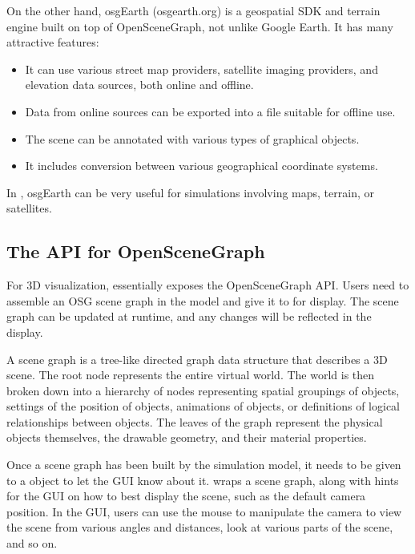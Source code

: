 On the other hand, osgEarth (osgearth.org) is a geospatial SDK and terrain
engine built on top of OpenSceneGraph, not unlike Google Earth. It has many
attractive features:

\begin{itemize}
  \item It can use various street map providers, satellite imaging providers, and
    elevation data sources, both online and offline.
  \item Data from online sources can be exported into a file suitable for offline use.
  \item The scene can be annotated with various types of graphical objects.
  \item It includes conversion between various geographical coordinate systems.
\end{itemize}

In \opp, osgEarth can be very useful for simulations involving maps, terrain, or satellites.

\subsection{The {\opp} API for OpenSceneGraph}
\label{sec:graphics:opp-api-for-osg}

For 3D visualization, {\opp} essentially exposes the OpenSceneGraph API. Users
need to assemble an OSG scene graph in the model and give it to {\opp} for
display. The scene graph can be updated at runtime, and any changes will be
reflected in the display.

\begin{note}
 A scene graph is a tree-like directed graph data
structure that describes a 3D scene. The root node represents the entire virtual
world. The world is then broken down into a hierarchy of nodes representing
spatial groupings of objects, settings of the position of objects, animations of
objects, or definitions of logical relationships between objects. The leaves of
the graph represent the physical objects themselves, the drawable geometry, and
their material properties.
\end{note}

Once a scene graph has been built by the simulation model, it needs to be given
to a  object to let the {\opp} GUI know about it.
 wraps a scene graph, along with hints for the GUI on how to
best display the scene, such as the default camera position. In the GUI, users
can use the mouse to manipulate the camera to view the scene from various angles
and distances, look at various parts of the scene, and so on.

